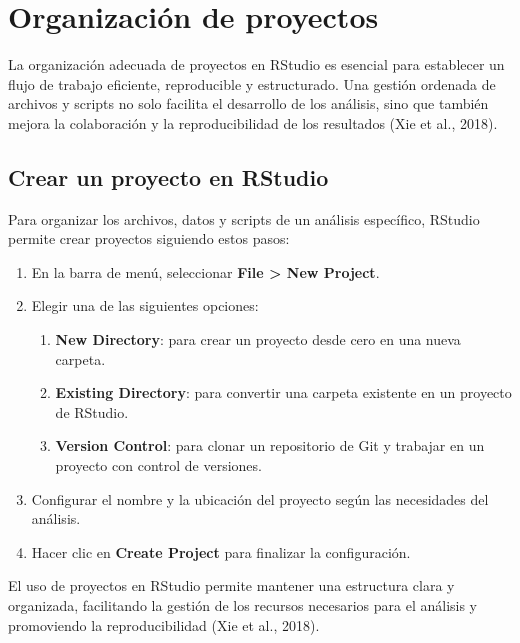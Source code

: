 \documentclass[
  spanish,
  a4paper,
  DIV=11,
  numbers=noendperiod,
  onepage,
  openany]{scrreprt}
\begin{document}
\section{Organización de proyectos}\label{organizaciuxf3n-de-proyectos}

La organización adecuada de proyectos en RStudio es esencial para
establecer un flujo de trabajo eficiente, reproducible y estructurado.
Una gestión ordenada de archivos y scripts no solo facilita el
desarrollo de los análisis, sino que también mejora la colaboración y la
reproducibilidad de los resultados (Xie et al., 2018).

\subsection{Crear un proyecto en
RStudio}\label{crear-un-proyecto-en-rstudio}

Para organizar los archivos, datos y scripts de un análisis específico,
RStudio permite crear proyectos siguiendo estos pasos:

\begin{enumerate}
\def\labelenumi{\arabic{enumi}.}
\item
  En la barra de menú, seleccionar \textbf{File \textgreater{} New
  Project}.
\item
  Elegir una de las siguientes opciones:

  \begin{enumerate}
  \def\labelenumii{\arabic{enumii}.}
  \item
    \textbf{New Directory}: para crear un proyecto desde cero en una
    nueva carpeta.
  \item
    \textbf{Existing Directory}: para convertir una carpeta existente en
    un proyecto de RStudio.
  \item
    \textbf{Version Control}: para clonar un repositorio de Git y
    trabajar en un proyecto con control de versiones.
  \end{enumerate}
\item
  Configurar el nombre y la ubicación del proyecto según las necesidades
  del análisis.
\item
  Hacer clic en \textbf{Create Project} para finalizar la configuración.
\end{enumerate}

El uso de proyectos en RStudio permite mantener una estructura clara y
organizada, facilitando la gestión de los recursos necesarios para el
análisis y promoviendo la reproducibilidad (Xie et al., 2018).
\end{document}
